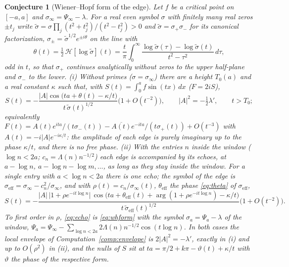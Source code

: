 \documentclass[11pt]{article}
\newtheorem{conjecture}[theorem]{Conjecture}
\theoremstyle{definition}
\theoremstyle{remark}
\begin{document}
\begin{conjecture}[Wiener--Hopf form of the edge]\label{conj:wh}
Let $f$ be a critical point on $[-a,a]$ and $\sigma_\infty=\Psi_\infty-\lambda$. For a real even symbol $\sigma$ with finitely many real zeros $\pm t_j$ write $\tilde\sigma=\sigma\prod_j(t^2+t_j^2)/(t^2-t_j^2)>0$ and $\tilde\sigma=\sigma_+\sigma_-$ for its canonical factorization, $\sigma_\pm=\tilde\sigma^{1/2}e^{\pm i\theta}$ on the line with
\begin{equation}\label{eq:theta}
\theta(t)=\tfrac12\,\mathcal H[\log\tilde\sigma](t)=\frac t\pi\int_0^\infty\frac{\log\tilde\sigma(\tau)-\log\tilde\sigma(t)}{t^2-\tau^2}\,d\tau ,
\end{equation}
odd in $t$, so that $\sigma_+$ continues analytically without zeros to the upper half-plane and $\sigma_-$ to the lower. (i) Without primes ($\sigma=\sigma_\infty$) there are a height $T_0(a)$ and a real constant $\kappa$ such that, with $S(t)=\int_0^af\sin(tx)\,dx$ ($F=2iS$),
\begin{equation}\label{eq:whform}
S(t)=-\frac{|A|\cos\big(ta+\theta(t)-\kappa/t\big)}{t\,\tilde\sigma(t)^{1/2}}\big(1+O(t^{-2})\big),\qquad |A|^2=-\tfrac12\lambda',\qquad t>T_0 ;
\end{equation}
equivalently $F(t)=A(t)e^{ita}/(t\sigma_-(t))-\overline{A(t)}e^{-ita}/(t\sigma_+(t))+O(t^{-3})$ with $A(t)=-i|A|e^{-i\kappa/t}$: the amplitude of each edge is purely imaginary up to the phase $\kappa/t$, and there is no free phase. (ii) With the entries $n$ inside the window ($\log n<2a$; $c_n=\Lambda(n)n^{-1/2}$) each edge is accompanied by its echoes, at $a-\log n$, $a-\log n-\log m,\dots$, as long as they stay inside the window. For a single entry with $a<\log n<2a$ there is one echo; the symbol of the edge is $\sigma_{\mathrm{eff}}=\sigma_\infty-c_n^2/\sigma_\infty$, and with $\rho(t)=c_n/\sigma_\infty(t)$, $\theta_{\mathrm{eff}}$ the phase \eqref{eq:theta} of $\sigma_{\mathrm{eff}}$,
\begin{equation}\label{eq:echo}
S(t)=-\frac{|A|\,\big|1+\rho e^{-it\log n}\big|\,\cos\big(ta+\theta_{\mathrm{eff}}(t)+\arg(1+\rho e^{-it\log n})-\kappa/t\big)}{t\,\tilde\sigma_{\mathrm{eff}}(t)^{1/2}}\big(1+O(t^{-2})\big).
\end{equation}
To first order in $\rho$, \eqref{eq:echo} is \eqref{eq:whform} with the symbol $\sigma_a=\Psi_a-\lambda$ of the window, $\Psi_a=\Psi_\infty-\sum_{\log n<2a}2\Lambda(n)n^{-1/2}\cos(t\log n)$. In both cases the local envelope of Computation~\ref{comp:envelope} is $2|A|^2=-\lambda'$, exactly in (i) and up to $O(\rho^2)$ in (ii), and the nulls of $S$ sit at $ta=\pi/2+k\pi-\vartheta(t)+\kappa/t$ with $\vartheta$ the phase of the respective form.
\end{conjecture}
\end{document}
